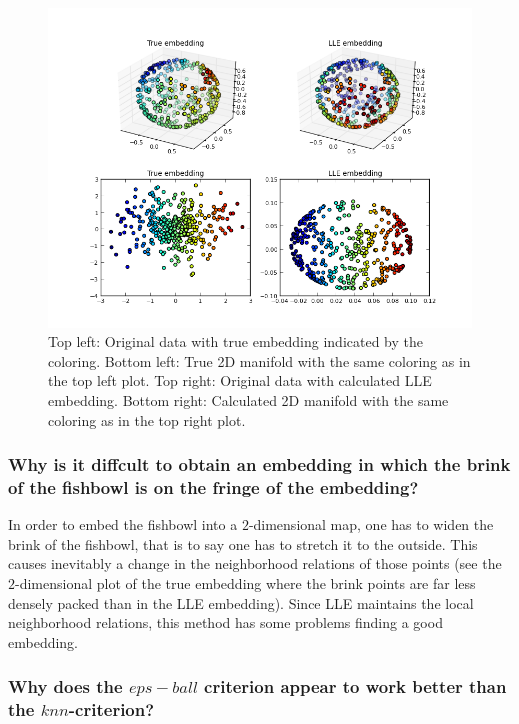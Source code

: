 \documentclass[a4paper, 12pt, titlepage]{article}
\begin{document}
\begin{figure}[H]
	\centering
	\includegraphics[width=17cm]{images/fishbowl.png}
	\caption{Top left: Original data with true embedding indicated by the coloring.
	Bottom left: True 2D manifold with the same coloring as in the top left plot.
	Top right: Original data with calculated LLE embedding.
	Bottom right: Calculated 2D manifold with the same coloring as in the top right plot.}
\end{figure}

\subsubsection*{Why is it diffcult to obtain an embedding in which the brink of the fishbowl is on the fringe of the embedding?}

In order to embed the fishbowl into a $2$-dimensional map, one has to widen the brink of the fishbowl, that is to say one has to stretch it to the outside. 
This causes inevitably a change in the neighborhood relations of those points (see the $2$-dimensional plot of the true embedding where the brink points are far less densely packed than in the LLE embedding).
Since LLE maintains the local neighborhood relations, this method has some problems finding a good embedding.

\subsubsection*{Why does the $eps-ball$ criterion appear to work better than the $knn$-criterion?}
\end{document}
